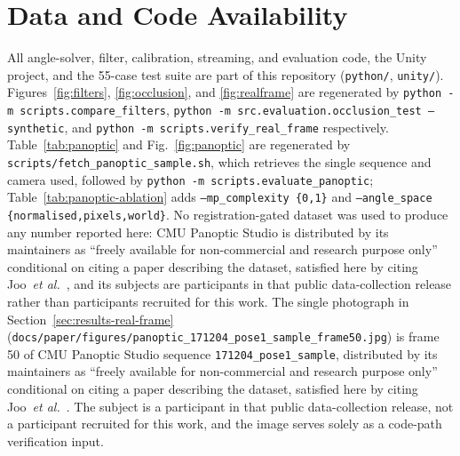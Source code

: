 \documentclass[conference]{IEEEtran}
\begin{document}
\section*{Data and Code Availability}
All angle-solver, filter, calibration, streaming, and evaluation code,
the Unity project, and the 55-case test suite are part of this repository
(\texttt{python/}, \texttt{unity/}). Figures~\ref{fig:filters},
\ref{fig:occlusion}, and \ref{fig:realframe} are regenerated by
\texttt{python -m scripts.compare\_filters},
\texttt{python -m src.evaluation.occlusion\_test --synthetic}, and
\texttt{python -m scripts.verify\_real\_frame} respectively.
Table~\ref{tab:panoptic} and Fig.~\ref{fig:panoptic} are regenerated by
\texttt{scripts/fetch\_panoptic\_sample.sh}, which retrieves the single
sequence and camera used, followed by
\texttt{python -m scripts.evaluate\_panoptic}; Table~\ref{tab:panoptic-ablation}
adds \texttt{--mp\_complexity \{0,1\}} and
\texttt{--angle\_space \{normalised,pixels,world\}}. No registration-gated
dataset was used to produce any number reported here: CMU Panoptic Studio
is distributed by its maintainers as ``freely available for
non-commercial and research purpose only'' conditional on citing a paper
describing the dataset, satisfied here by citing
Joo~\textit{et al.}~\cite{joo2015panoptic}, and its subjects are
participants in that public data-collection release rather than
participants recruited for this work. The single photograph in
Section~\ref{sec:results-real-frame}
(\texttt{docs/paper/figures/panoptic\_171204\_pose1\_sample\_frame50.jpg})
is frame 50 of CMU Panoptic Studio sequence
\texttt{171204\_pose1\_sample}, distributed by its maintainers as
``freely available for non-commercial and research purpose only''
conditional on citing a paper describing the dataset, satisfied here by
citing Joo~\textit{et al.}~\cite{joo2015panoptic}. The subject is a
participant in that public data-collection release, not a participant
recruited for this work, and the image serves solely as a code-path
verification input.
\end{document}
